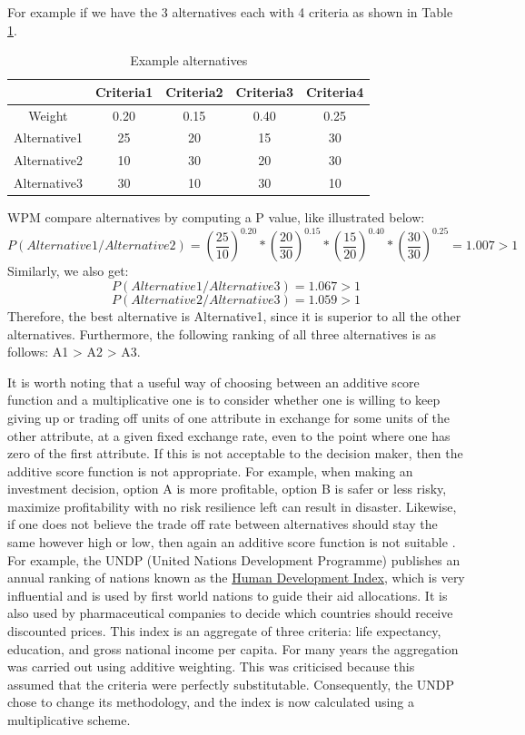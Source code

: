 For example if we have the 3 alternatives each with 4 criteria as shown in
Table \ref{table:WPM_data}.
\begin{table}
\caption{Example alternatives \label{table:WPM_data}} 
\begin{center}
\begin{tabular}{ c c c c c }
\hline
&	Criteria1 &	Criteria2 &	Criteria3 &	Criteria4 \\
\hline
Weight &	0.20 &	0.15 &	0.40 &	0.25\\
\hline
Alternative1 &	25 &	20 &	15 &	30\\
Alternative2 &	10 &	30 &	20 &	30\\
Alternative3 &	30 &	10 &	30 &	10\\
\hline
\end{tabular}
\end{center}
\end{table}
WPM compare alternatives by computing a P value, like illustrated below:
$$
P(Alternative1/Alternative2)=
(\frac{25}{10})^{0.20}
*(\frac{20}{30})^{0.15}
*(\frac{15}{20})^{0.40}
*(\frac{30}{30})^{0.25}
=1.007 > 1
$$
Similarly, we also get:
$$
P(Alternative1/Alternative3)=1.067 > 1
$$
$$
P(Alternative2/Alternative3)=1.059 > 1
$$
Therefore, the best alternative is Alternative1, since it is superior to all the other alternatives. Furthermore, the following ranking of all three alternatives is as follows: A1 > A2 > A3.

It is worth noting that a useful way of choosing
between an additive score function and a multiplicative one is to consider
whether one is willing to keep giving up or trading off units of one attribute
in exchange for some units of the other attribute, at
a given fixed exchange rate, even to the point where
one has zero of the first attribute. 
If this is not acceptable to the decision maker, then the additive score
function is not appropriate.
For example, when making an investment decision, option A is more profitable, option B is safer or less risky, maximize profitability with no risk resilience left can result in disaster.
Likewise, if one does not believe the trade off rate between alternatives should stay the same however high or low, then again an additive score function is not suitable \cite{AddorMultiply}.
For example, the UNDP (United Nations Development Programme)
publishes an annual ranking of nations known as the
\href{http://hdr.undp.org}{Human Development Index},
which is very influential and is used by first world
nations to guide their aid allocations.
It is also used by pharmaceutical companies to decide which countries should receive discounted prices.
This index is an aggregate of three criteria: life expectancy, education, and gross national income per capita.
For many years the aggregation was carried out using additive weighting.
This was criticised because this assumed that the criteria were perfectly substitutable. Consequently, the UNDP chose to
change its methodology, and the index
is now calculated using a multiplicative scheme.


